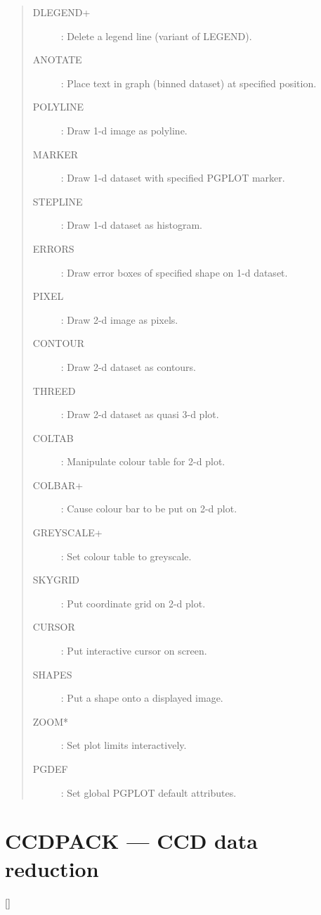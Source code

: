 \begin{description}
\begin{quote}
\begin{description}
\item [DLEGEND+] : Delete a legend line (variant of LEGEND).
\item [ANOTATE] :  Place text in graph (binned dataset) at specified position.
\\
\item [POLYLINE] : Draw 1-d image as polyline.
\item [MARKER] :   Draw 1-d dataset with specified PGPLOT marker.
\item [STEPLINE] : Draw 1-d dataset as histogram.
\item [ERRORS] :   Draw error boxes of specified shape on 1-d dataset.
\\
\item [PIXEL] :    Draw 2-d image as pixels.
\item [CONTOUR] :  Draw 2-d dataset as contours.
\item [THREED] :   Draw 2-d dataset as quasi 3-d plot.
\\
\item [COLTAB] :   Manipulate colour table for 2-d plot.
\item [COLBAR+] :  Cause colour bar to be put on 2-d plot.
\item [GREYSCALE+] : Set colour table to greyscale.
\item [SKYGRID] :  Put coordinate grid on 2-d plot.
\\
\item [CURSOR] :   Put interactive cursor on screen.
\item [SHAPES] :   Put a shape onto a displayed image.
\item [ZOOM*] :    Set plot limits interactively.
\\
\item [PGDEF] :    Set global PGPLOT default attributes.
\end{description}
\end{quote}
\end{description}

\newpage

\section{CCDPACK --- CCD data reduction}

\vspace{-10mm}

\hfill []

\vspace{2mm}

